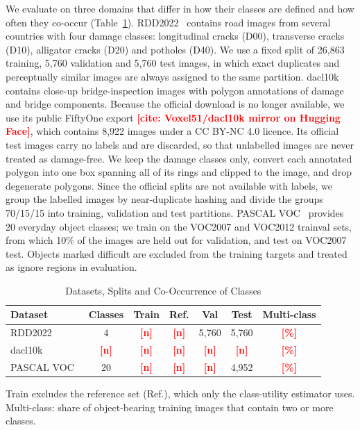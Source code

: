 \documentclass[conference]{IEEEtran}
\newcommand{\todo}[1]{\textcolor{red}{\textbf{[#1]}}}
\begin{document}
We evaluate on three domains that differ in how their classes are defined and how often they co-occur (Table~\ref{tab:datasets}). RDD2022~\cite{arya2024rdd} contains road images from several countries with four damage classes: longitudinal cracks (D00), transverse cracks (D10), alligator cracks (D20) and potholes (D40). We use a fixed split of 26,863 training, 5,760 validation and 5,760 test images, in which exact duplicates and perceptually similar images are always assigned to the same partition. dacl10k~\cite{flotzinger2024dacl10k} contains close-up bridge-inspection images with polygon annotations of damage and bridge components. Because the official download is no longer available, we use its public FiftyOne export \todo{cite: Voxel51/dacl10k mirror on Hugging Face}, which contains 8,922 images under a CC BY-NC 4.0 licence. Its official test images carry no labels and are discarded, so that unlabelled images are never treated as damage-free. We keep the damage classes only, convert each annotated polygon into one box spanning all of its rings and clipped to the image, and drop degenerate polygons. Since the official splits are not available with labels, we group the labelled images by near-duplicate hashing and divide the groups 70/15/15 into training, validation and test partitions. PASCAL VOC~\cite{everingham2010voc} provides 20 everyday object classes; we train on the VOC2007 and VOC2012 trainval sets, from which 10\% of the images are held out for validation, and test on VOC2007 test. Objects marked difficult are excluded from the training targets and treated as ignore regions in evaluation.

\begin{table}[t]
\caption{Datasets, Splits and Co-Occurrence of Classes}
\label{tab:datasets}
\centering
\footnotesize
\setlength{\tabcolsep}{3pt}
\begin{tabular}{@{}lcccccc@{}}
\toprule
\textbf{Dataset} & \textbf{Classes} & \textbf{Train} & \textbf{Ref.} & \textbf{Val} & \textbf{Test} & \textbf{Multi-class} \\
\midrule
RDD2022~\cite{arya2024rdd} & 4 & \todo{n} & \todo{n} & 5,760 & 5,760 & \todo{\%} \\
dacl10k~\cite{flotzinger2024dacl10k} & \todo{n} & \todo{n} & \todo{n} & \todo{n} & \todo{n} & \todo{\%} \\
PASCAL VOC~\cite{everingham2010voc} & 20 & \todo{n} & \todo{n} & \todo{n} & 4,952 & \todo{\%} \\
\bottomrule
\end{tabular}
\vspace{2pt}

\parbox{\columnwidth}{\footnotesize Train excludes the reference set (Ref.), which only the class-utility estimator uses. Multi-class: share of object-bearing training images that contain two or more classes.}
\end{table}
\end{document}
